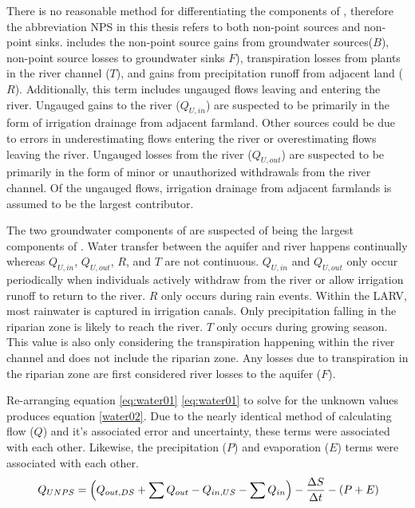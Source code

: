 \begin{linenumbers}
There is no reasonable method for differentiating the components of \Qnps, therefore the abbreviation NPS in this thesis refers to both non-point sources and non-point sinks.   \Qnps includes the non-point source gains from groundwater sources($ B $), non-point source losses to groundwater sinks {}$ F $), transpiration losses from plants in the river channel ($ T $), and gains from precipitation runoff from adjacent land ($ R $).  Additionally, this term includes ungauged flows leaving and entering the river.  Ungauged gains to the river ($ Q_{U,in} $) are suspected to be primarily in the form of irrigation drainage from adjacent farmland.  Other sources could be due to errors in underestimating flows entering the river or overestimating flows leaving the river.  Ungauged losses from the river ($ Q_{U,out} $) are suspected to be primarily in the form of minor or unauthorized withdrawals from the river channel.  Of the ungauged flows, irrigation drainage from adjacent farmlands is assumed to be the largest contributor.

The two groundwater components of \Qnps are suspected of being the largest components of \Qnps.  Water transfer between the aquifer and river happens continually whereas $ Q_{U,in} $, $ Q_{U,out} $, $ R $, and $ T $ are not continuous.  $ Q_{U,in} $ and $ Q_{U,out} $ only occur periodically when individuals actively withdraw from the river or allow irrigation runoff to return to the river.  $ R $ only occurs during rain events.  Within the LARV, most rainwater is captured in irrigation canals.  Only precipitation falling in the riparian zone is likely to reach the river.  $ T $ only occurs during growing season.  This value is also only considering the transpiration happening within the river channel and does not include the riparian zone.  Any losses due to transpiration in the riparian zone are first considered river losses to the aquifer ($ F $).


Re-arranging equation \eqref{eq:water01} \ref{eq:water01} to solve for the unknown values produces equation \ref{water02}.  Due to the nearly identical method of calculating flow ($ Q $) and it's associated error and uncertainty, these terms were associated with each other.  Likewise, the precipitation ($ P $) and evaporation ($ E $) terms were associated with each other.
\begin{equation}\
Q_{UNPS} = \left( Q_{out,DS} + \sum Q_{out} - Q_{in,US} - \sum Q_{in} \right) - \frac{\Delta S}{\Delta t} - \left( P + E \right)\\ \label{water02}
\end{equation}


\end{linenumbers}
